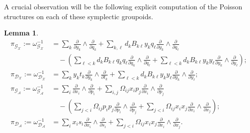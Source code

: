 \documentclass{amsart}
\newtheorem{lemma}[theorem]{Lemma}
\numberwithin{equation}{section}
\newcommand{\cA}{\mathcal{A}}
\newcommand{\cG}{\mathcal{G}}
\newcommand{\cD}{\mathcal{D}}
\newcommand{\cX}{\mathcal{X}}
\begin{document}
A crucial observation will be the following explicit computation of the Poisson structures on each of these symplectic groupoids.
\begin{lemma}
  \label{le:groupoid Poisson structures}
  \begin{align}
    \pi_{\cG_\cX}:=\omega_{\cG_\cX}^{-1}&=\sum_{k} \frac{\partial}{\partial y_k} \wedge \frac{\partial}{\partial q_k} + \sum_{k, \ell} d_kB_{k\ell}y_k q_\ell \frac{\partial}{\partial y_k} \wedge \frac{\partial}{\partial q_\ell}\\
			\nonumber &\quad- \left(
			  \sum_{\ell < k} d_kB_{k\ell}q_kq_\ell \frac{\partial}{\partial q_k} \wedge \frac{\partial}{\partial q_\ell}
			  + \sum_{\ell < k} d_kB_{k\ell}y_ky_\ell \frac{\partial}{\partial y_k} \wedge \frac{\partial}{\partial y_\ell}
			\right);\\
    \pi_{\cD_\cX}:=\omega_{\cD_\cX}^{-1}&=\sum_{k} y_kt_k\frac{\partial}{\partial y_k} \wedge \frac{\partial}{\partial t_k}+\sum_{\ell < k} d_kB_{k\ell}y_ky_\ell \frac{\partial}{\partial y_k} \wedge \frac{\partial}{\partial y_\ell};\\
    \pi_{\cG_\cA}:=\omega_{\cG_\cA}^{-1}&=\sum_{i} \frac{\partial}{\partial x_i} \wedge \frac{\partial}{\partial p_i} + \sum_{i, j} \Omega_{ij}x_i p_j \frac{\partial}{\partial x_i} \wedge \frac{\partial}{\partial p_j}\\
			\nonumber &\quad- \left(
			  \sum_{j < i} \Omega_{ij}p_ip_j \frac{\partial}{\partial p_i} \wedge \frac{\partial}{\partial p_j}
			  + \sum_{j < i} \Omega_{ij}x_ix_j \frac{\partial}{\partial x_i} \wedge \frac{\partial}{\partial x_j}
			\right);\\
    \pi_{\cD_\cA}:=\omega_{\cD_\cA}^{-1}&=\sum_{i} x_is_i\frac{\partial}{\partial x_i} \wedge \frac{\partial}{\partial s_i}+\sum_{j < i} \Omega_{ij}x_ix_j \frac{\partial}{\partial x_i} \wedge \frac{\partial}{\partial x_j}.
  \end{align}
\end{lemma}
\end{document}
